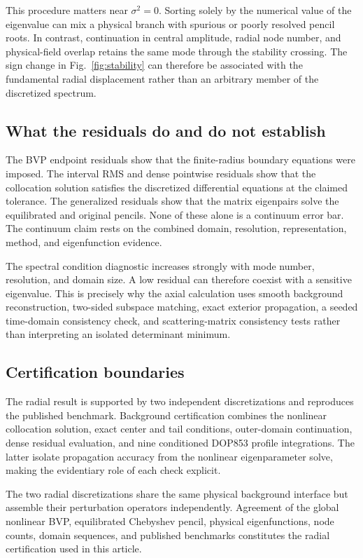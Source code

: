 \documentclass[aps,prd,preprint,onecolumn,nofootinbib,superscriptaddress,showkeys]{revtex4-2}
\newcommand{\sigmatwo}{\sigma^{2}}
\begin{document}
This procedure matters near $\sigmatwo=0$. Sorting solely by the numerical value of the eigenvalue can mix a physical branch with spurious or poorly resolved pencil roots. In contrast, continuation in central amplitude, radial node number, and physical-field overlap retains the same mode through the stability crossing. The sign change in Fig.~\ref{fig:stability} can therefore be associated with the fundamental radial displacement rather than an arbitrary member of the discretized spectrum.

\subsection{What the residuals do and do not establish}

The BVP endpoint residuals show that the finite-radius boundary equations were imposed. The interval RMS and dense pointwise residuals show that the collocation solution satisfies the discretized differential equations at the claimed tolerance. The generalized residuals show that the matrix eigenpairs solve the equilibrated and original pencils. None of these alone is a continuum error bar. The continuum claim rests on the combined domain, resolution, representation, method, and eigenfunction evidence.

The spectral condition diagnostic increases strongly with mode number, resolution, and domain size. A low residual can therefore coexist with a sensitive eigenvalue. This is precisely why the axial calculation uses smooth background reconstruction, two-sided subspace matching, exact exterior propagation, a seeded time-domain consistency check, and scattering-matrix consistency tests rather than interpreting an isolated determinant minimum.

\subsection{Certification boundaries}

The radial result is supported by two independent discretizations and reproduces the published benchmark. Background certification combines the nonlinear collocation solution, exact center and tail conditions, outer-domain continuation, dense residual evaluation, and nine conditioned DOP853 profile integrations. The latter isolate propagation accuracy from the nonlinear eigenparameter solve, making the evidentiary role of each check explicit.

The two radial discretizations share the same physical background interface but assemble their perturbation operators independently. Agreement of the global nonlinear BVP, equilibrated Chebyshev pencil, physical eigenfunctions, node counts, domain sequences, and published benchmarks constitutes the radial certification used in this article.
\end{document}
